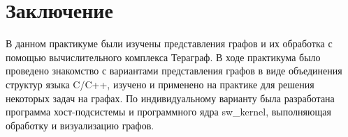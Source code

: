 \section*{Заключение}
В данном практикуме были изучены представления графов и их обработка с помощью вычислительного комплекса Тераграф. В ходе практикума было проведено знакомство с вариантами представления графов в виде объединения структур языка C/C++, изучено и применено на практике для решения некоторых задач на графах. По индивидуальному варианту была  разработана программа хост-подсистемы и программного ядра sw\_kernel, выполняющая обработку и визуализацию графов.

\newpage